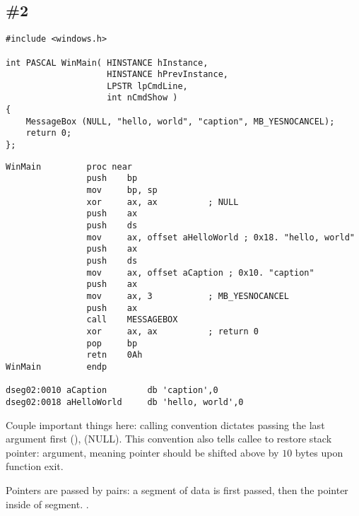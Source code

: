 ﻿\subsection{\Example{} \#2}
\label{win16_messagebox}

\begin{lstlisting}
#include <windows.h>

int PASCAL WinMain( HINSTANCE hInstance,
                    HINSTANCE hPrevInstance,
                    LPSTR lpCmdLine,
                    int nCmdShow )
{
	MessageBox (NULL, "hello, world", "caption", MB_YESNOCANCEL);
	return 0;
};
\end{lstlisting}

\begin{lstlisting}
WinMain         proc near
                push    bp
                mov     bp, sp
                xor     ax, ax          ; NULL
                push    ax
                push    ds
                mov     ax, offset aHelloWorld ; 0x18. "hello, world"
                push    ax
                push    ds
                mov     ax, offset aCaption ; 0x10. "caption"
                push    ax
                mov     ax, 3           ; MB_YESNOCANCEL
                push    ax
                call    MESSAGEBOX
                xor     ax, ax          ; return 0
                pop     bp
                retn    0Ah
WinMain         endp

dseg02:0010 aCaption        db 'caption',0
dseg02:0018 aHelloWorld     db 'hello, world',0
\end{lstlisting}

{Couple important things here:  calling convention dictates passing the last argument first} 
(),  (NULL).
{This convention also tells \gls{callee} to restore} \gls{stack pointer}:
    
{argument, meaning pointer should be shifted above by $10$ bytes upon function exit}.

{Pointers are passed by pairs: a segment of data is first passed, then the pointer inside of segment}.
.

